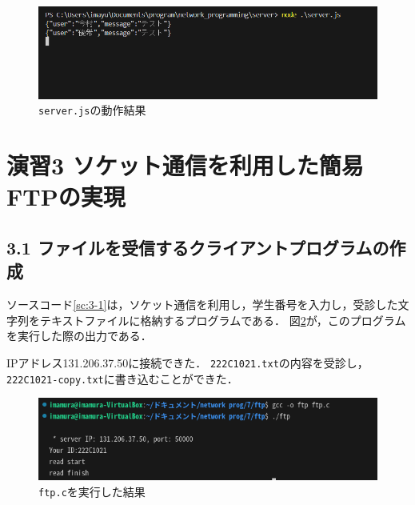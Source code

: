 \documentclass[documentclass]{jsarticle}
\begin{document}
\begin{figure}[H]
  \begin{center}
    \includegraphics*[scale=0.7]{figure/2-2.png}
  \end{center}
  \caption[]{\texttt{server.js}の動作結果}
  \label{fig:2-2}
\end{figure}

\newpage

\section*{演習3 ソケット通信を利用した簡易FTPの実現}
\subsection*{3.1 ファイルを受信するクライアントプログラムの作成}
ソースコード\ref*{sc:3-1}は，ソケット通信を利用し，学生番号を入力し，受診した文字列をテキストファイルに格納するプログラムである．
図\ref*{fig:3-1}が，このプログラムを実行した際の出力である．

IPアドレス131.206.37.50に接続できた．
\texttt{222C1021.txt}の内容を受診し，\texttt{222C1021-copy.txt}に書き込むことができた．


\begin{figure}[H]
  \begin{center}
    \includegraphics*[]{figure/3-1.png}
  \end{center}
  \caption[]{\texttt{ftp.c}を実行した結果}
  \label{fig:3-1}
\end{figure}
\end{document}
